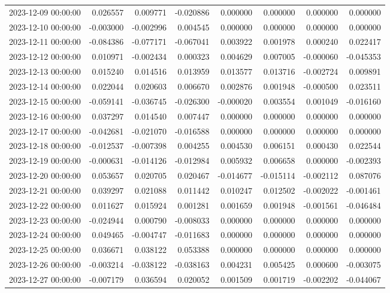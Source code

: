 \begin{tabular}{lrrrrrrr}
2023-12-09 00:00:00 & 0.026557 & 0.009771 & -0.020886 & 0.000000 & 0.000000 & 0.000000 & 0.000000 \\
2023-12-10 00:00:00 & -0.003000 & -0.002996 & 0.004545 & 0.000000 & 0.000000 & 0.000000 & 0.000000 \\
2023-12-11 00:00:00 & -0.084386 & -0.077171 & -0.067041 & 0.003922 & 0.001978 & 0.000240 & 0.022417 \\
2023-12-12 00:00:00 & 0.010971 & -0.002434 & 0.000323 & 0.004629 & 0.007005 & -0.000060 & -0.045353 \\
2023-12-13 00:00:00 & 0.015240 & 0.014516 & 0.013959 & 0.013577 & 0.013716 & -0.002724 & 0.009891 \\
2023-12-14 00:00:00 & 0.022044 & 0.020603 & 0.006670 & 0.002876 & 0.001948 & -0.000500 & 0.023511 \\
2023-12-15 00:00:00 & -0.059141 & -0.036745 & -0.026300 & -0.000020 & 0.003554 & 0.001049 & -0.016160 \\
2023-12-16 00:00:00 & 0.037297 & 0.014540 & 0.007447 & 0.000000 & 0.000000 & 0.000000 & 0.000000 \\
2023-12-17 00:00:00 & -0.042681 & -0.021070 & -0.016588 & 0.000000 & 0.000000 & 0.000000 & 0.000000 \\
2023-12-18 00:00:00 & -0.012537 & -0.007398 & 0.004255 & 0.004530 & 0.006151 & 0.000430 & 0.022544 \\
2023-12-19 00:00:00 & -0.000631 & -0.014126 & -0.012984 & 0.005932 & 0.006658 & 0.000000 & -0.002393 \\
2023-12-20 00:00:00 & 0.053657 & 0.020705 & 0.020467 & -0.014677 & -0.015114 & -0.002112 & 0.087076 \\
2023-12-21 00:00:00 & 0.039297 & 0.021088 & 0.011442 & 0.010247 & 0.012502 & -0.002022 & -0.001461 \\
2023-12-22 00:00:00 & 0.011627 & 0.015924 & 0.001281 & 0.001659 & 0.001948 & -0.001561 & -0.046484 \\
2023-12-23 00:00:00 & -0.024944 & 0.000790 & -0.008033 & 0.000000 & 0.000000 & 0.000000 & 0.000000 \\
2023-12-24 00:00:00 & 0.049465 & -0.004747 & -0.011683 & 0.000000 & 0.000000 & 0.000000 & 0.000000 \\
2023-12-25 00:00:00 & 0.036671 & 0.038122 & 0.053388 & 0.000000 & 0.000000 & 0.000000 & 0.000000 \\
2023-12-26 00:00:00 & -0.003214 & -0.038122 & -0.038163 & 0.004231 & 0.005425 & 0.000600 & -0.003075 \\
2023-12-27 00:00:00 & -0.007179 & 0.036594 & 0.020052 & 0.001509 & 0.001719 & -0.002202 & -0.044067 \\

\end{tabular}
